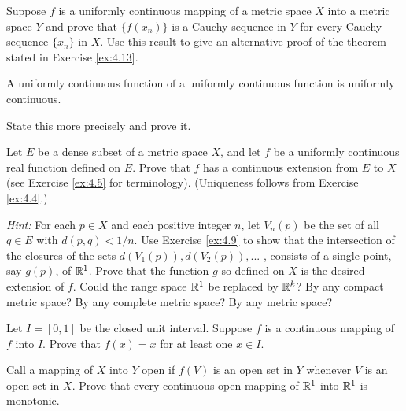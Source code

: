\begin{myExercise}
    \label{ex:4.11}
    Suppose $f$ is a uniformly continuous mapping of a metric space $X$ into a metric space $Y$ and prove that $\{f(x_n)\}$ is a Cauchy sequence in $Y$ for every Cauchy sequence $\{x_n\}$ in $X$. 
    Use this result to give an alternative proof of the theorem stated in Exercise \ref{ex:4.13}.
\end{myExercise}


\begin{myExercise}
    \label{ex:4.12}
    A uniformly continuous function of a uniformly continuous function is uniformly continuous.
    
    State this more precisely and prove it.
\end{myExercise}


\begin{myExercise}
    \label{ex:4.13}
    Let $E$ be a dense subset of a metric space $X$, 
    and let $f$ be a uniformly continuous real function defined on $E$.
    Prove that $f$ has a continuous extension from $E$ to $X$
    (see Exercise \ref{ex:4.5} for terminology). 
    (Uniqueness follows from Exercise \ref{ex:4.4}.) 
    
    \emph{Hint:} For each $p \in X$ and each positive integer $n$, 
    let $V_n(p)$ be the set of all $q \in E$ with $d(p, q) < 1/n$. 
    Use Exercise \ref{ex:4.9} to show that the intersection of the closures of the sets $d(V_1(p)), d(V_2(p)), ...$ , 
    consists of a single point, say $g(p)$, of ${\protect\mathbb R}^1$. 
    Prove that the function $g$ so defined on $X$ is the desired extension of $f$.
    Could the range space ${\protect\mathbb R}^1$ be replaced by ${\protect\mathbb R}^k$? 
    By any compact metric space?
    By any complete metric space? 
    By any metric space?
\end{myExercise}


\begin{myExercise}
    \label{ex:4.14}
    Let $I = [0, 1]$ be the closed unit interval. 
    Suppose $f$ is a continuous mapping of $f$ into $I$. 
    Prove that $f(x) = x$ for at least one $x \in I$.
\end{myExercise}


\begin{myExercise}
    \label{ex:4.15}
    Call a mapping of $X$ into $Y$ open 
    if $f(V)$ is an open set in $Y$ whenever $V$ is an open set in $X$.
    Prove that every continuous open mapping of ${\protect\mathbb R}^1$ into ${\protect\mathbb R}^1$ is monotonic.
\end{myExercise}


